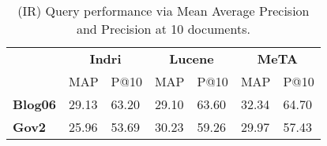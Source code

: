 \begin{table}[t]
\centering
{\small
    \begin{tabular}{|l|p{.65cm}p{.65cm}|p{.65cm}p{.65cm}|p{.65cm}p{.65cm}|}
    \hline &
    \multicolumn{2}{c|}{\textbf{Indri}} &
    \multicolumn{2}{c|}{\textbf{Lucene}} &
    \multicolumn{2}{c|}{\textbf{MeTA}} \\
    & MAP & P@10 & MAP & P@10 & MAP & P@10\\
    \hline
    \textbf{Blog06} & 29.13 & 63.20 & 29.10 & 63.60 & 32.34 & 64.70 \\
    \textbf{Gov2} & 25.96 & 53.69 & 30.23 & 59.26 & 29.97 & 57.43 \\
    \hline
\end{tabular}
\caption{(IR) Query performance via Mean Average Precision and Precision at 10
    documents.}
\label{table:ir-map}
}
\end{table}
